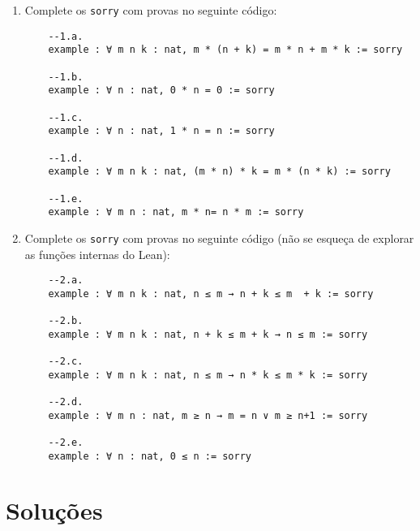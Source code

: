 \begin{enumerate}
    \item Complete os \lstinline{sorry} com provas no seguinte código:
    
    \begin{lstlisting}
    --1.a.
    example : ∀ m n k : nat, m * (n + k) = m * n + m * k := sorry
    
    --1.b.
    example : ∀ n : nat, 0 * n = 0 := sorry
    
    --1.c.
    example : ∀ n : nat, 1 * n = n := sorry
    
    --1.d.
    example : ∀ m n k : nat, (m * n) * k = m * (n * k) := sorry
    
    --1.e.
    example : ∀ m n : nat, m * n= n * m := sorry
    \end{lstlisting}
    
    \item Complete os \lstinline{sorry} com provas no seguinte código (não se esqueça de explorar as funções internas do Lean):
    
    \begin{lstlisting}
    --2.a.
    example : ∀ m n k : nat, n ≤ m → n + k ≤ m  + k := sorry
    
    --2.b.
    example : ∀ m n k : nat, n + k ≤ m + k → n ≤ m := sorry
    
    --2.c.
    example : ∀ m n k : nat, n ≤ m → n * k ≤ m * k := sorry
    
    --2.d.
    example : ∀ m n : nat, m ≥ n → m = n ∨ m ≥ n+1 := sorry
    
    --2.e.
    example : ∀ n : nat, 0 ≤ n := sorry
    \end{lstlisting}
\end{enumerate}

\section{Soluções}

